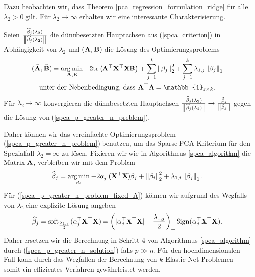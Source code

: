 Dazu beobachten wir, dass Theorem \ref{pca_regression_formulation_ridge} für alle $\lambda_2 > 0$ gilt. Für $\lambda_2 \to \infty$ erhalten wir eine interessante Charakterisierung.
\begin{thm} \label{spca_p_greater_n}
Seien $\frac{\widehat{\beta}_j(\lambda_2)}{\left\lVert \widehat{\beta}_j(\lambda_2) \right\rVert}$ die dünnbesetzten Hauptachsen aus (\ref{spca_criterion}) in Abhängigkeit von $\lambda_2$
und $(\tilde{\mathbf{A}}, \tilde{\mathbf{B}})$ die Lösung des Optimierungsproblems
\begin{align}
\label{spca_p_greater_n_problem}
\begin{gathered}
(\tilde{\mat A}, \tilde{\mat B}) = \argmin_{\mat A, \mat B} -2\spur{\mat A^{\top}\mat X^{\top}\mat X \mat B} + \sum_{j=1}^k \norm{\beta_j}_2^2 + \sum_{j=1}^k \lambda_{1,j}\norm{\beta_j}_1\\
\text{unter der Nebenbedingung, dass } \mat A^{\top} \mat A = \mat{\mathbb{1}}_{k \times k}.
\end{gathered}
\end{align}
Für $\lambda_2 \to \infty$ konvergieren die dünnbesetzten Hauptachsen $\frac{\widehat{\beta}_j(\lambda_2)}{\left\lVert \widehat{\beta}_j(\lambda_2) \right\rVert} \to \frac{\tilde{\beta}_j}{\left\lVert \tilde{\beta}_j \right\rVert}$ gegen die Lösung von (\ref{spca_p_greater_n_problem}). 
\end{thm}

Daher können wir das vereinfachte Optimierungsproblem (\ref{spca_p_greater_n_problem}) benutzen, um das Sparse PCA Kriterium für den Spezialfall $\lambda_2 = \infty$ zu lösen. Fixieren wir wie in Algorithmus \ref{spca_algorithm} die Matrix $\mathbf{A}$, verbleiben wir mit dem Problem
\begin{align}
\label{spca_p_greater_n_problem_fixed_A}
\widehat{\beta}_j = \operatorname*{arg\,min}_{\beta_j} -2 \alpha_j^{\top}(\mathbf{X}^{\top}\mathbf{X})\beta_j + \left\lVert \beta_j \right\rVert_{2}^{2} + \lambda_{1,j}\left\lVert \beta_j \right\rVert_1.
\end{align}
Für (\ref{spca_p_greater_n_problem_fixed_A}) können wir aufgrund des Wegfalls von $\lambda_2$ eine explizite Lösung angeben
\begin{align}
\label{spca_p_greater_n_solution}
\widehat{\beta}_j = \operatorname{soft}_{\frac{\lambda_{1,j}}{2}}(\alpha_j^{\top}\mathbf{X}^{\top}\mathbf{X}) = \left(|\alpha_j^{\top}\mathbf{X}^{\top}\mathbf{X}| - \frac{\lambda_{1,j}}{2}\right)_+ \operatorname{Sign}(\alpha_j^{\top}\mathbf{X}^{\top}\mathbf{X}).
\end{align}
Daher ersetzen wir die Berechnung in Schritt 4 von Algorithmus \ref{spca_algorithm} durch (\ref{spca_p_greater_n_solution}) falls $p \gg n$. Für den hochdimensionalen Fall kann durch das Wegfallen der Berechnung von $k$ Elastic Net Problemen somit ein effizientes Verfahren gewährleistet werden.

